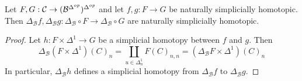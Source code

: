 



\begin{lem}[label=lem:diagHo]
    Let $F,G: \mathcal{C}\rightarrow (\mathcal{B}^{\Delta^{op}})^{\Delta^{op}}$ and let $f,g:F\to G$ be naturally simplicially homotopic. Then $\Delta_\mathcal{B}f,\Delta_\mathcal{B}g:\Delta_\mathcal{B}\circ F\to\Delta_\mathcal{B}\circ G$ are naturally simplicially homotopic.
\end{lem}
\begin{proof}
    Let $h:F\times \Delta^1\to G$ be a simplicial homotopy between $f$ and $g$. Then 
    \begin{equation*}
        \Delta_\mathcal{B}(F\times \Delta^1)(C)_n = \coprod_{u \in \Delta^1_n}F(C)_{n,n} = (\Delta_\mathcal{B}F\times \Delta^1)(C)_n
    \end{equation*}
    In particular, $\Delta_\mathcal{B}h$ defines a simplicial homotopy from $\Delta_\mathcal{B}f$ to $\Delta_\mathcal{B}g$.
\end{proof}


